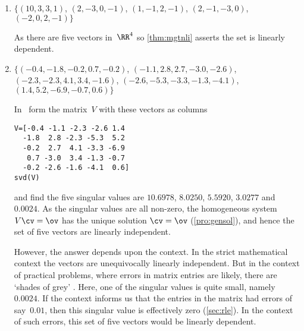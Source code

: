 \begin{example}
\begin{enumerate}
\item \(\{(10,3,3,1)\), \(( 2,-3,0,-1)\), \(( 1,-1,2,-1)\), \(( 2,-1,-3,0)\), \((-2,0,2,-1)\}\)
\begin{solution} 
As there are five vectors in~\(\RR^4\) so \autoref{thm:mgtnli} asserts the set is linearly dependent.
\end{solution}



\item \(\{(-0.4,-1.8,-0.2, 0.7,-0.2)\), \((-1.1, 2.8, 2.7,-3.0,-2.6)\), \((-2.3,-2.3, 4.1, 3.4,-1.6)\), \((-2.6,-5.3,-3.3,-1.3,-4.1)\), \(( 1.4, 5.2,-6.9,-0.7, 0.6)\}\)
\begin{solution} 
In \script\ form the matrix~\(V\) with these vectors as columns
\begin{verbatim}
V=[-0.4 -1.1 -2.3 -2.6 1.4
  -1.8  2.8 -2.3 -5.3  5.2
  -0.2  2.7  4.1 -3.3 -6.9
   0.7 -3.0  3.4 -1.3 -0.7
  -0.2 -2.6 -1.6 -4.1  0.6]
svd(V)
\end{verbatim}
\setbox\ajrqrbox\hbox{}%
\marginpar{\usebox{\ajrqrbox}}%
and find the five singular values are \(10.6978\), \(8.0250\), \(5.5920\), \(3.0277\) and~\(0.0024\).
As the singular values are all non-zero, the homogeneous system \(V\cv=\ov\) has the unique solution \(\cv=\ov\) (\autoref{pro:gensol}), and hence the set of five vectors are linearly independent.

However, the answer depends upon the context.  
In the strict mathematical context the vectors are unequivocally linearly independent.
But in the context of practical problems, where errors in matrix entries are likely, there are `shades of grey' . 
Here, one of the singular values is quite small, namely~\(0.0024\).
If the context informs us that the entries in the matrix had errors of say~\(0.01\), then this singular value is effectively zero (\autoref{sec:rle}).
In the context of such errors, this set of five vectors would be  linearly dependent.
\end{solution}


\end{enumerate}
\end{example}













